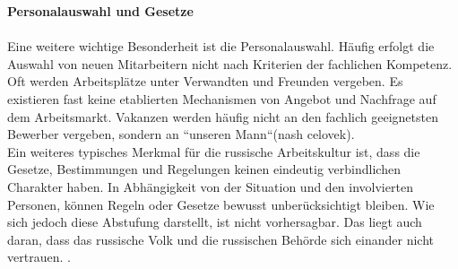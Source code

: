 	\textbf{Personalauswahl und Gesetze}\\
	\\
	 Eine weitere wichtige Besonderheit ist die Personalauswahl. Häufig erfolgt die Auswahl von neuen Mitarbeitern nicht nach Kriterien der fachlichen Kompetenz. Oft werden Arbeitsplätze unter Verwandten und Freunden vergeben. Es existieren fast keine etablierten Mechanismen von Angebot und Nachfrage auf dem Arbeitsmarkt. Vakanzen werden häufig nicht an den fachlich geeignetsten Bewerber vergeben, sondern an ``unseren Mann``(nash celovek).\\
	 Ein weiteres typisches Merkmal für die russische Arbeitskultur ist, dass die Gesetze, Bestimmungen und Regelungen keinen eindeutig verbindlichen Charakter haben. In Abhängigkeit von der Situation und den involvierten Personen, können Regeln oder Gesetze bewusst unberücksichtigt bleiben. Wie sich jedoch diese Abstufung darstellt, ist nicht vorhersagbar. Das liegt auch daran, dass das russische Volk und die russischen Behörde sich einander nicht vertrauen. \cite{ProzessbeglBerRU}.
 
